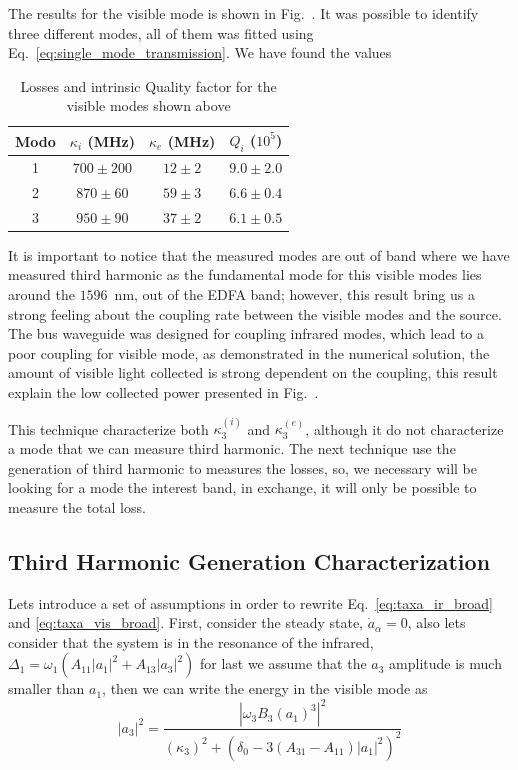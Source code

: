 The results for the visible mode is shown in Fig.~. It was possible to identify three different modes, all of them  was fitted using Eq.~\ref{eq:single_mode_transmission}. We have found the values
\begin{table}[h]
\centering
\begin{tabularx}{8cm}{c|c|c|c}
Modo & $\kappa_i$ (MHz) & $\kappa_e$ (MHz) & $Q_i$ ($10^5$) \\ 
\hline                               
1 &$700\pm200$&$12\pm2$&$9.0\pm2.0$\\
2 &$870\pm60$&$59\pm3$&$6.6\pm0.4$\\
3 &$950\pm90$&$37\pm2$&$6.1\pm0.5$
\end{tabularx}
\caption{Losses and intrinsic Quality factor for the visible modes shown above}
\end{table}

It is important to notice that the measured modes are out of band where we have measured third harmonic as the fundamental mode for this visible modes lies around the $1596$~nm, out of the EDFA band; however, this result bring us a strong feeling about the coupling rate between the visible modes and the source. The bus waveguide was designed for coupling infrared modes, which lead to a poor coupling for visible mode, as demonstrated in the numerical solution, the amount of visible light collected is strong dependent on the coupling, this result explain the low collected power presented in Fig.~.

This technique characterize both $\kappa_3^{(i)}$ and $\kappa_3^{(e)}$, although it do not characterize a mode that we can measure third harmonic. The next technique use the generation of third harmonic to measures the losses, so, we necessary will be looking for a mode the interest band, in exchange, it will only be possible to measure the total loss. 

\subsection{Third Harmonic Generation Characterization}

Lets introduce a set of assumptions in order to rewrite Eq.~\ref{eq:taxa_ir_broad} and \ref{eq:taxa_vis_broad}. First, consider the steady state, $\dot{a}_\alpha = 0$, also lets consider that the system is in the resonance of the infrared, $\Delta_1 = \omega_1(A_{11}|a_1|^2+A_{13}|a_3|^2)$ for last we assume that the $a_3$ amplitude is much smaller than $a_1$, then we can write the energy in the visible mode as
\begin{equation}
    |a_3|^2 = \frac{|\omega_3 B_3 (a_1)^3|^2}{\left(\kappa_3\right)^2 + \left(\delta_0 - 3(A_{31}-A_{11})|a_1|^2\right)^2}
    \label{eq:thg_phase_mismatch}
\end{equation}

